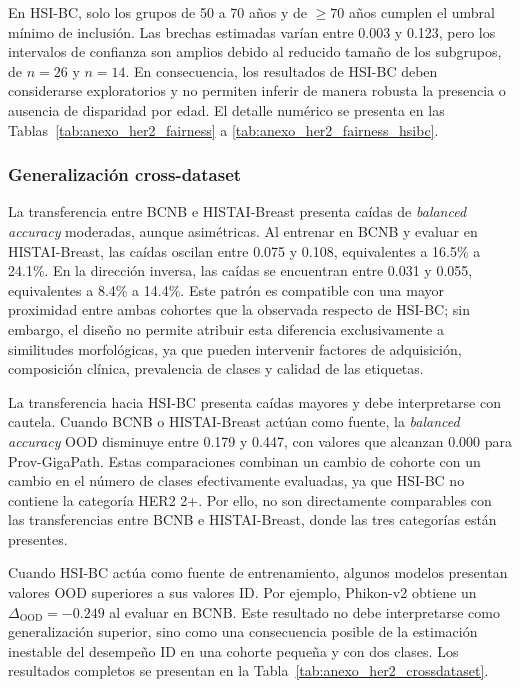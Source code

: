 En HSI-BC, solo los grupos de 50 a 70 años y de $\geq 70$ años cumplen el umbral mínimo de inclusión. Las brechas estimadas varían entre 0.003 y 0.123, pero los intervalos de confianza son amplios debido al reducido tamaño de los subgrupos, de $n=26$ y $n=14$. En consecuencia, los resultados de HSI-BC deben considerarse exploratorios y no permiten inferir de manera robusta la presencia o ausencia de disparidad por edad. El detalle numérico se presenta en las Tablas~\ref{tab:anexo_her2_fairness} a \ref{tab:anexo_her2_fairness_hsibc}.

\subsubsection{Generalización cross-dataset}

La transferencia entre BCNB e HISTAI-Breast presenta caídas de \textit{balanced accuracy} moderadas, aunque asimétricas. Al entrenar en BCNB y evaluar en HISTAI-Breast, las caídas oscilan entre 0.075 y 0.108, equivalentes a 16.5\% a 24.1\%. En la dirección inversa, las caídas se encuentran entre 0.031 y 0.055, equivalentes a 8.4\% a 14.4\%. Este patrón es compatible con una mayor proximidad entre ambas cohortes que la observada respecto de HSI-BC; sin embargo, el diseño no permite atribuir esta diferencia exclusivamente a similitudes morfológicas, ya que pueden intervenir factores de adquisición, composición clínica, prevalencia de clases y calidad de las etiquetas.

La transferencia hacia HSI-BC presenta caídas mayores y debe interpretarse con cautela. Cuando BCNB o HISTAI-Breast actúan como fuente, la \textit{balanced accuracy} OOD disminuye entre 0.179 y 0.447, con valores que alcanzan 0.000 para Prov-GigaPath. Estas comparaciones combinan un cambio de cohorte con un cambio en el número de clases efectivamente evaluadas, ya que HSI-BC no contiene la categoría HER2 2+. Por ello, no son directamente comparables con las transferencias entre BCNB e HISTAI-Breast, donde las tres categorías están presentes.

Cuando HSI-BC actúa como fuente de entrenamiento, algunos modelos presentan valores OOD superiores a sus valores ID. Por ejemplo, Phikon-v2 obtiene un $\Delta_{\text{OOD}}=-0.249$ al evaluar en BCNB. Este resultado no debe interpretarse como generalización superior, sino como una consecuencia posible de la estimación inestable del desempeño ID en una cohorte pequeña y con dos clases. Los resultados completos se presentan en la Tabla~\ref{tab:anexo_her2_crossdataset}.

